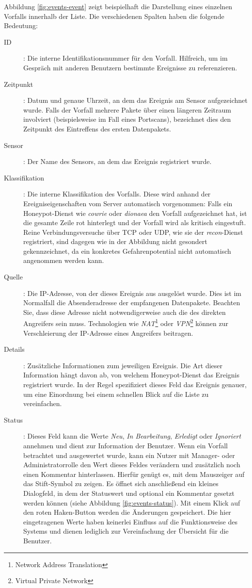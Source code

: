 \documentclass[12pt]{article}
\begin{document}
Abbildung \ref{fig:events-event} zeigt beispielhaft die Darstellung eines einzelnen Vorfalls innerhalb der Liste. Die verschiedenen Spalten haben die folgende Bedeutung:
\begin{description}
				\item[ID]: Die interne Identifikationsnummer für den Vorfall. Hilfreich, um im Gespräch mit anderen Benutzern bestimmte Ereignisse zu referenzieren.
				\item[Zeitpunkt]: Datum und genaue Uhrzeit, an dem das Ereignis am Sensor aufgezeichnet wurde. Falls der Vorfall mehrere Pakete über einen längeren Zeitraum involviert (beispielsweise im Fall eines Portscans), bezeichnet dies den Zeitpunkt des Eintreffens des ersten Datenpakets.
				\item[Sensor]: Der Name des Sensors, an dem das Ereignis registriert wurde.
				\item[Klassifikation]: Die interne Klassifikation des Vorfalls. Diese wird anhand der Ereigniseigenschaften vom Server automatisch vorgenommen: Falls ein Honeypot-Dienst wie \textit{cowrie} oder \textit{dionaea} den Vorfall aufgezeichnet hat, ist die gesamte Zeile rot hinterlegt und der Vorfall wird als kritisch eingestuft. Reine Verbindungsversuche über TCP oder UDP, wie sie der \textit{recon}-Dienst registriert, sind dagegen wie in der Abbildung nicht gesondert gekennzeichnet, da ein konkretes Gefahrenpotential nicht automatisch angenommen werden kann.
				\item[Quelle]: Die IP-Adresse, von der dieses Ereignis aus ausgelöst wurde. Dies ist im Normalfall die Absenderadresse der empfangenen Datenpakete. Beachten Sie, dass diese Adresse nicht notwendigerweise auch die des direkten Angreifers sein muss. Technologien wie \textit{NAT}\footnote{Network Address Translation} oder \textit{VPN}\footnote{Virtual Private Network} können zur Verschleierung der IP-Adresse eines Angreifers beitragen.
				\item[Details]: Zusätzliche Informationen zum jeweiligen Ereignis. Die Art dieser Information hängt davon ab, von welchem Honeypot-Dienst das Ereignis registriert wurde. In der Regel spezifiziert dieses Feld das Ereignis genauer, um eine Einordnung bei einem schnellen Blick auf die Liste zu vereinfachen.
				\item[Status]: Dieses Feld kann die Werte \textit{Neu}, \textit{In Bearbeitung}, \textit{Erledigt} oder \textit{Ignoriert} annehmen und dient zur Information der Benutzer. Wenn ein Vorfall betrachtet und ausgewertet wurde, kann ein Nutzer mit Manager- oder Administratorrolle den Wert dieses Feldes verändern und zusätzlich noch einen Kommentar hinterlassen. Hierfür genügt es, mit dem Mauszeiger auf das Stift-Symbol zu zeigen. Es öffnet sich anschließend ein kleines Dialogfeld, in dem der Statuswert und optional ein Kommentar gesetzt werden können (siehe Abbildung \ref{fig:events-status}). Mit einem Klick auf den roten Haken-Button werden die Änderungen gespeichert. Die hier eingetragenen Werte haben keinerlei Einfluss auf die Funktionsweise des Systems und dienen lediglich zur Vereinfachung der Übersicht für die Benutzer.
\end{description}
\end{document}
